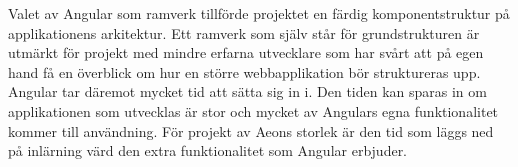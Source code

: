 Valet av Angular som ramverk tillförde projektet en färdig komponentstruktur på applikationens arkitektur. Ett ramverk som själv står för grundstrukturen är utmärkt för projekt med mindre erfarna utvecklare som har svårt att på egen hand få en överblick om hur en större webbapplikation bör struktureras upp. Angular tar däremot mycket tid att sätta sig in i. Den tiden kan sparas in om applikationen som utvecklas är stor och mycket av Angulars egna funktionalitet kommer till användning. För projekt av Aeons storlek är den tid som läggs ned på inlärning värd den extra funktionalitet som Angular erbjuder.

